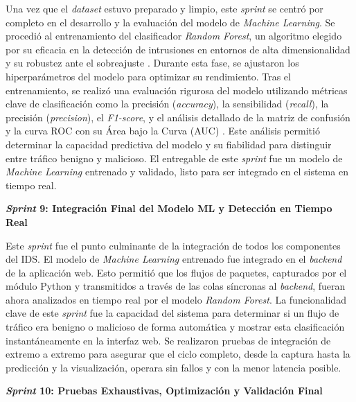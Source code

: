 Una vez que el \textit{dataset} estuvo preparado y limpio, este \textit{sprint} se centró por completo en el desarrollo y la evaluación del modelo de \textit{Machine Learning}. Se procedió al entrenamiento del clasificador \textit{Random Forest}, un algoritmo elegido por su eficacia en la detección de intrusiones en entornos de alta dimensionalidad y su robustez ante el sobreajuste \cite{Breiman2001RandomForests}. Durante esta fase, se ajustaron los hiperparámetros del modelo para optimizar su rendimiento. Tras el entrenamiento, se realizó una evaluación rigurosa del modelo utilizando métricas clave de clasificación como la precisión (\textit{accuracy}), la sensibilidad (\textit{recall}), la precisión (\textit{precision}), el \textit{F1-score}, y el análisis detallado de la matriz de confusión y la curva ROC con su Área bajo la Curva (AUC) \cite{PolaniaArias2021EvaluacionMLIDS}. Este análisis permitió determinar la capacidad predictiva del modelo y su fiabilidad para distinguir entre tráfico benigno y malicioso. El entregable de este \textit{sprint} fue un modelo de \textit{Machine Learning} entrenado y validado, listo para ser integrado en el sistema en tiempo real.

\textbf{\textit{Sprint} 9: Integración Final del Modelo ML y Detección en Tiempo Real}

Este \textit{sprint} fue el punto culminante de la integración de todos los componentes del IDS. El modelo de \textit{Machine Learning} entrenado fue integrado en el \textit{backend} de la aplicación web. Esto permitió que los flujos de paquetes, capturados por el módulo Python y transmitidos a través de las colas síncronas al \textit{backend}, fueran ahora analizados en tiempo real por el modelo \textit{Random Forest}. La funcionalidad clave de este \textit{sprint} fue la capacidad del sistema para determinar si un flujo de tráfico era benigno o malicioso de forma automática y mostrar esta clasificación instantáneamente en la interfaz web. Se realizaron pruebas de integración de extremo a extremo para asegurar que el ciclo completo, desde la captura hasta la predicción y la visualización, operara sin fallos y con la menor latencia posible.

\textbf{\textit{Sprint} 10: Pruebas Exhaustivas, Optimización y Validación Final}

